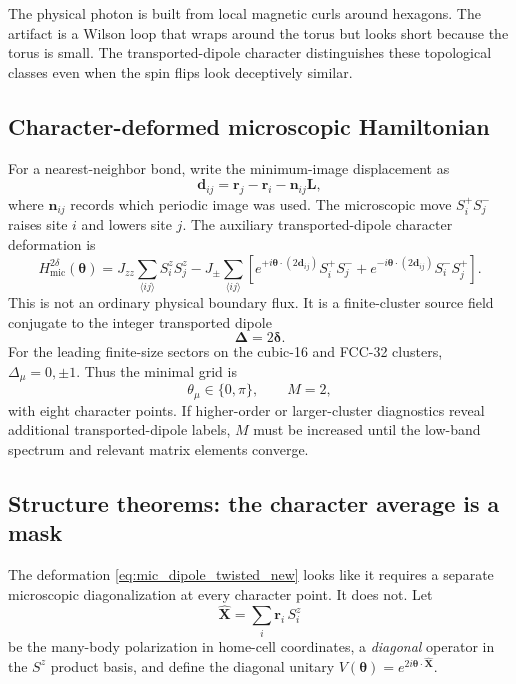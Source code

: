 \documentclass[11pt,letterpaper]{article}
\newcommand{\Jzz}{J_{zz}}
\newcommand{\Jpm}{J_{\pm}}
\newcommand{\bd}{\bm d}
\newcommand{\bn}{\bm n}
\newcommand{\bL}{\bm L}
\newcommand{\br}{\bm r}
\newcommand{\bdelta}{\bm \delta}
\newcommand{\bDelta}{\bm \Delta}
\newcommand{\btheta}{\bm \theta}
\newcommand{\Hmic}{H_{\mathrm{mic}}}
\theoremstyle{plain}
\theoremstyle{definition}
\begin{document}
\begin{intuition}
The physical photon is built from local magnetic curls around hexagons.  The
artifact is a Wilson loop that wraps around the torus but looks short because
the torus is small.  The transported-dipole character distinguishes these
topological classes even when the spin flips look deceptively similar.
\end{intuition}

\subsection{Character-deformed microscopic Hamiltonian}

For a nearest-neighbor bond, write the minimum-image displacement as
\[
\bd_{ij}=\br_j-\br_i-\bn_{ij}\bL ,
\]
where $\bn_{ij}$ records which periodic image was used.  The microscopic move
$S_i^+S_j^-$ raises site $i$ and lowers site $j$.  The auxiliary
transported-dipole character deformation is
\begin{equation}
\Hmic^{2\delta}(\btheta)=
\Jzz\sum_{\langle ij\rangle}S_i^zS_j^z
-\Jpm\sum_{\langle ij\rangle}
\left[
e^{+i\btheta\cdot(2\bd_{ij})}S_i^+S_j^-
+e^{-i\btheta\cdot(2\bd_{ij})}S_i^-S_j^+
\right].
\label{eq:mic_dipole_twisted_new}
\end{equation}
This is not an ordinary physical boundary flux.  It is a finite-cluster source
field conjugate to the integer transported dipole
\[
\bDelta=2\bdelta .
\]
For the leading finite-size sectors on the cubic-16 and FCC-32 clusters,
$\Delta_\mu=0,\pm1$.  Thus the minimal grid is
\begin{equation}
\theta_\mu\in\{0,\pi\},\qquad M=2,
\label{eq:m2_grid_new}
\end{equation}
with eight character points.  If higher-order or larger-cluster diagnostics
reveal additional transported-dipole labels, $M$ must be increased until the
low-band spectrum and relevant matrix elements converge.

\subsection{Structure theorems: the character average is a mask}
\label{sec:structure_theorems}

The deformation \eqref{eq:mic_dipole_twisted_new} looks like it requires a
separate microscopic diagonalization at every character point.  It does not.
Let
\begin{equation}
\hat{\bm X}=\sum_i \br_i\,S_i^z
\end{equation}
be the many-body polarization in home-cell coordinates, a \emph{diagonal}
operator in the $S^z$ product basis, and define the diagonal unitary
$V(\btheta)=e^{2i\btheta\cdot\hat{\bm X}}$.
\end{document}
